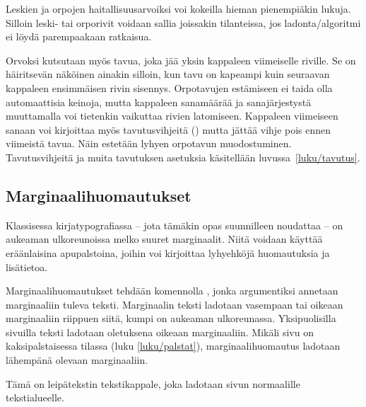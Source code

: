 \begin{koodilohkosis}
\end{koodilohkosis}

\noindent
Leskien ja orpojen haitallisuusarvoiksi voi kokeilla hieman pienempiäkin
lukuja. Silloin leski- tai orporivit voidaan sallia joissakin
tilanteissa, jos ladonta\-/algoritmi ei löydä parempaakaan ratkaisua.

Orvoksi kutsutaan myös tavua, joka jää yksin kappaleen viimeiselle
riville. Se on häiritsevän näköinen ainakin silloin, kun tavu on
kapeampi kuin seuraavan kappaleen ensimmäisen rivin sisennys.
Orpotavujen estämiseen ei taida olla automaattisia keinoja, mutta
kappaleen sanamäärää ja sanajärjestystä muuttamalla voi tietenkin
vaikuttaa rivien latomiseen. Kappaleen viimeiseen sanaan voi kirjoittaa
myös tavutusvihjeitä (\komento{-}) mutta jättää vihje pois ennen
viimeistä tavua. Näin estetään lyhyen orpotavun muodostuminen.
Tavutusvihjeitä ja muita tavutuksen asetuksia käsitellään
luvussa~\ref{luku/tavutus}.

\subsection{Marginaalihuomautukset}
\label{luku/marginaalihuomautukset}

Klassisessa kirjatypografiassa -- jota tämäkin opas suunnilleen
noudattaa -- on aukeaman ulkoreunoissa melko suuret marginaalit. Niitä
voidaan käyttää eräänlaisina apupalstoina, joihin voi kirjoittaa
lyhyehköjä huomautuksia ja lisätietoa.

Marginaalihuomautukset tehdään komennolla , jonka
argumentiksi annetaan marginaaliin tuleva teksti. Marginaalin teksti
ladotaan vasempaan tai oikeaan marginaaliin riippuen siitä, kumpi on
aukeaman ulkoreunassa. Yksipuolisilla sivuilla teksti ladotaan
oletuksena oikeaan marginaaliin. Mikäli sivu on kaksipalstaisessa
tilassa (luku \ref{luku/palstat}), marginaalihuomautus ladotaan
lähempänä olevaan marginaaliin.

\begin{koodilohkosis}
Tämä on leipätekstin tekstikappale,
joka ladotaan sivun normaalille tekstialueelle.
\end{koodilohkosis}


